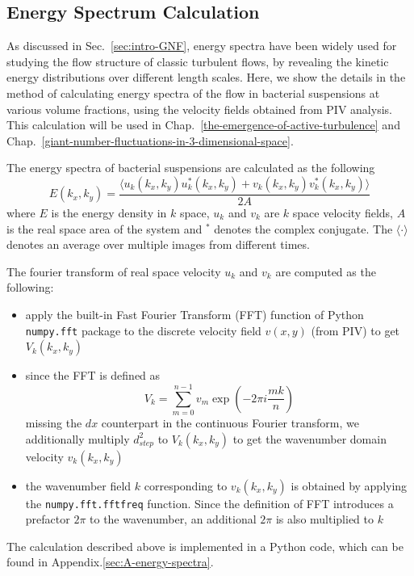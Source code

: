 \subsection{Energy Spectrum Calculation}
As discussed in Sec.~\ref{sec:intro-GNF}, energy spectra have been widely used for studying the flow structure of classic turbulent flows, by revealing the kinetic energy distributions over different length scales. Here, we show the details in the method of calculating energy spectra of the flow in bacterial suspensions at various volume fractions, using the velocity fields obtained from PIV analysis. This calculation will be used in Chap.~\ref{the-emergence-of-active-turbulence} and Chap.~\ref{giant-number-fluctuations-in-3-dimensional-space}.

The energy spectra of bacterial suspensions are calculated as the following
%
\begin{equation}
E(k_x, k_y) = \frac{\langle u_k(k_x, k_y)u^*_k(k_x, k_y)+v_k(k_x, k_y)v_k^*(k_x, k_y)\rangle}{2A}
\end{equation}
%
where $E$ is the energy density in $k$ space, $u_k$ and $v_k$ are $k$ space velocity fields, $A$ is the real space area of the system and $^*$ denotes the complex conjugate. The $\langle\cdot\rangle$ denotes an average over multiple images from different times.

The fourier transform of real space velocity $u_k$ and $v_k$ are computed as the following:
\begin{itemize}
  \item apply the built-in Fast Fourier Transform (FFT) function of Python \texttt{numpy.fft} package to the discrete velocity field $v(x, y)$ (from PIV) to get $V_k(k_x, k_y)$
  \item since the FFT is defined as
    $$
    V_k=\sum^{n-1}_{m=0}v_m\exp(-2\pi i \frac{mk}{n})
    $$
    missing the $dx$ counterpart in the continuous Fourier transform, we additionally multiply $d_{step}^2$ to $V_k(k_x, k_y)$ to get the wavenumber domain velocity $v_k(k_x, k_y)$
  \item the wavenumber field $k$ corresponding to $v_k(k_x, k_y)$ is obtained by applying the \texttt{numpy.fft.fftfreq} function. Since the definition of FFT introduces a prefactor $2\pi$ to the wavenumber, an additional $2\pi$ is also multiplied to $k$
\end{itemize}

The calculation described above is implemented in a Python code, which can be found in Appendix.\ref{sec:A-energy-spectra}.

